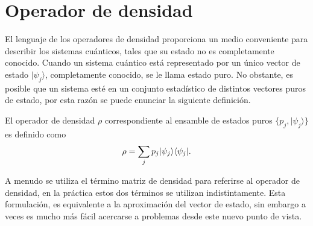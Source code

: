 \section{Operador de densidad}\label{sec:Cap1:OpDensidad}%
El lenguaje de los operadores de densidad proporciona un  medio conveniente
para describir los sistemas cuánticos, tales que su estado no es completamente
conocido. Cuando un sistema cuántico está representado por un único vector de
estado $|\psi_j\rangle $, completamente conocido, se le llama estado puro. No
obstante, es posible que un sistema esté en un conjunto estadístico de
distintos vectores puros de estado, por esta razón se puede enunciar la
siguiente definición.

\begin{definition} El operador de densidad
$\rho$ correspondiente al ensamble de estados puros $\{p_j,|\psi_j \rangle \}$
es definido como {\cite{wilde2011classical}}
  	\begin{equation}{\label{defdensityoperator}}
  		\rho=\sum_{j}p_j|\psi_j\rangle \langle \psi_j|.
  	\end{equation}
\end{definition}
A menudo se utiliza el término matriz de densidad para referirse al operador de
densidad, en la práctica estos dos términos se utilizan indistintamente. Esta
formulación, es equivalente a la aproximación del vector de estado, sin embargo
a veces es mucho más fácil acercarse a problemas desde este nuevo punto de
vista.
 
